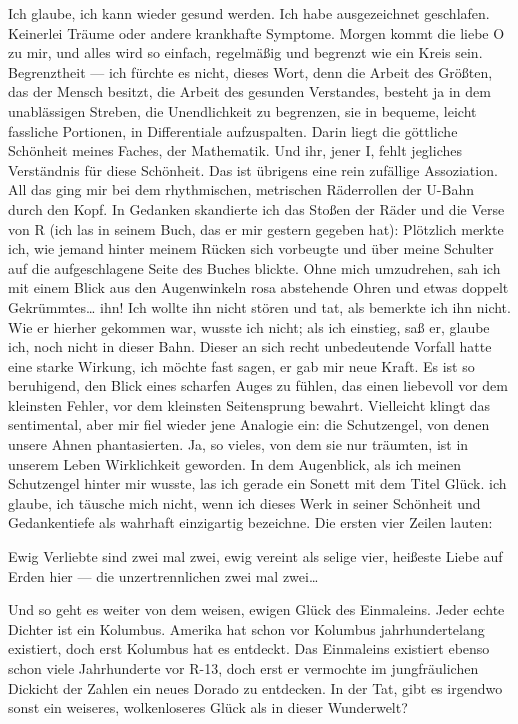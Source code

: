 Ich glaube, ich kann wieder gesund werden. Ich habe ausgezeichnet
geschlafen. Keinerlei Träume oder andere krankhafte Symptome.
Morgen kommt die liebe O zu mir, und alles wird so einfach,
regelmäßig und begrenzt wie ein Kreis sein. Begrenztheit — ich
fürchte es nicht, dieses Wort, denn die Arbeit des Größten, das der
Mensch besitzt, die Arbeit des gesunden Verstandes, besteht ja in
dem unablässigen Streben, die Unendlichkeit zu begrenzen, sie in
bequeme, leicht fassliche Portionen, in Differentiale aufzuspalten.
Darin liegt die göttliche Schönheit meines Faches, der Mathematik.
Und ihr, jener I, fehlt jegliches Verständnis für diese Schönheit.
Das ist übrigens eine rein zufällige Assoziation. All das ging mir
bei dem rhythmischen, metrischen Räderrollen
der U-Bahn durch den Kopf. In Gedanken skandierte ich das
Stoßen der Räder und die Verse von R (ich las in seinem Buch, das
er mir gestern gegeben hat): Plötzlich merkte ich, wie jemand
hinter meinem Rücken sich vorbeugte und über meine Schulter auf die
aufgeschlagene Seite des Buches blickte. Ohne mich umzudrehen, sah
ich mit einem Blick aus den Augenwinkeln rosa abstehende Ohren und
etwas doppelt Gekrümmtes\ldots{} ihn! Ich wollte ihn nicht stören und
tat, als bemerkte ich ihn nicht. Wie er hierher gekommen war,
wusste ich nicht; als ich einstieg, saß er, glaube ich, noch nicht
in dieser Bahn. Dieser an sich recht unbedeutende Vorfall hatte
eine starke Wirkung, ich möchte fast sagen, er gab mir neue Kraft.
Es ist so beruhigend, den Blick eines scharfen Auges zu fühlen, das
einen liebevoll vor dem kleinsten Fehler, vor dem kleinsten
Seitensprung bewahrt. Vielleicht klingt das sentimental, aber mir
fiel wieder jene Analogie ein: die Schutzengel, von denen unsere
Ahnen phantasierten. Ja, so vieles, von dem sie nur träumten, ist
in unserem Leben Wirklichkeit geworden. In dem Augenblick, als ich
meinen Schutzengel hinter mir wusste, las ich gerade ein Sonett mit
dem Titel Glück. ich glaube, ich täusche mich nicht, wenn ich
dieses Werk in seiner Schönheit und Gedankentiefe als wahrhaft
einzigartig bezeichne. Die ersten vier Zeilen lauten:

Ewig Verliebte sind zwei mal zwei, ewig vereint als selige vier,
heißeste Liebe auf Erden hier — die unzertrennlichen zwei mal
zwei\ldots{}

Und so geht es weiter von dem weisen, ewigen Glück des Einmaleins.
Jeder echte Dichter ist ein Kolumbus. Amerika hat schon vor
Kolumbus jahrhundertelang existiert, doch erst Kolumbus hat es
entdeckt. Das Einmaleins existiert ebenso schon viele Jahrhunderte
vor R-13, doch erst er vermochte im jungfräulichen Dickicht der
Zahlen ein neues Dorado zu entdecken. In der Tat, gibt es irgendwo
sonst ein weiseres, wolkenloseres Glück als in dieser Wunderwelt?

